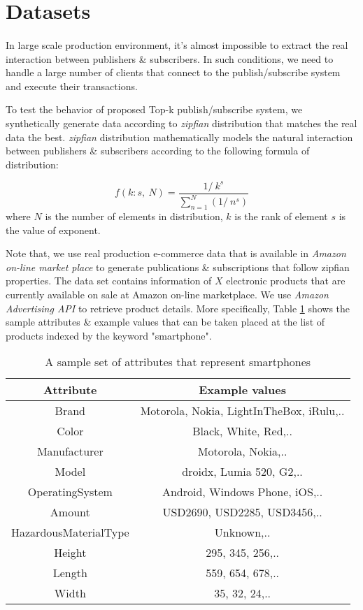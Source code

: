 \documentclass[a4paper,12pt,oneside]{book}
\theoremstyle{definition}
\theoremstyle{remark}
\begin{document}
\section{Datasets}
\paragraph*{}
In large scale production environment, it's almost impossible to extract the real interaction between publishers \& subscribers. In such conditions, we need to handle a large number of clients that connect to the publish/subscribe system and execute their transactions.

To test the behavior of proposed Top-k publish/subscribe system, we synthetically generate data according to \emph{zipfian} distribution that matches the real data the best. \emph{zipfian} distribution mathematically models the natural interaction between publishers \& subscribers according to the following formula of distribution:

\[ f(k:s,\ N)=\frac{1/\ k^s}{\sum_{n=1}^{N}(1/\ n^s)}\]
where $N$ is the number of elements in distribution, $k$ is the rank of element $s$ is the value of exponent.

Note that, we use real production e-commerce data that is available in \emph{Amazon on-line market place} to generate publications \& subscriptions that follow zipfian properties. The data set contains information of $X$ electronic products that are currently available on sale at Amazon on-line marketplace. We use \emph{Amazon Advertising API} to retrieve product details. More specifically, Table \ref{table:amazonatt} shows the sample attributes \& example values that can be taken placed at the list of products indexed by the keyword "smartphone".

\begin{table}[ht]
\caption{A sample set of attributes that represent smartphones} %
\centering %
\begin{tabular}{c c} %
\hline\hline %
\textbf{Attribute} & \textbf{Example values} \\ [0.5ex] %
\hline %
Brand & Motorola, Nokia, LightInTheBox, iRulu,..\\ %
Color & Black, White, Red,..\\ %
Manufacturer & Motorola, Nokia,..\\
Model & droidx, Lumia 520, G2,..\\
OperatingSystem & Android, Windows Phone, iOS,..\\
Amount & USD2690, USD2285, USD3456,..\\
HazardousMaterialType & Unknown,..\\
Height & 295, 345, 256,..\\
Length & 559, 654, 678,..\\
Width & 35, 32, 24,..\\
\hline %
\end{tabular}
\label{table:amazonatt} %
\end{table}
\end{document}
